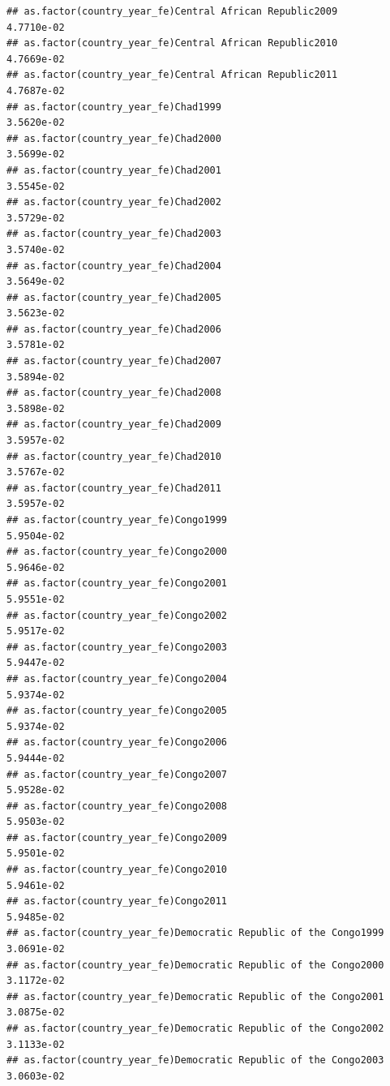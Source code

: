 \documentclass[
  a4paper,
]{article}
\begin{document}
\begin{verbatim}
## as.factor(country_year_fe)Central African Republic2009          4.7710e-02
## as.factor(country_year_fe)Central African Republic2010          4.7669e-02
## as.factor(country_year_fe)Central African Republic2011          4.7687e-02
## as.factor(country_year_fe)Chad1999                              3.5620e-02
## as.factor(country_year_fe)Chad2000                              3.5699e-02
## as.factor(country_year_fe)Chad2001                              3.5545e-02
## as.factor(country_year_fe)Chad2002                              3.5729e-02
## as.factor(country_year_fe)Chad2003                              3.5740e-02
## as.factor(country_year_fe)Chad2004                              3.5649e-02
## as.factor(country_year_fe)Chad2005                              3.5623e-02
## as.factor(country_year_fe)Chad2006                              3.5781e-02
## as.factor(country_year_fe)Chad2007                              3.5894e-02
## as.factor(country_year_fe)Chad2008                              3.5898e-02
## as.factor(country_year_fe)Chad2009                              3.5957e-02
## as.factor(country_year_fe)Chad2010                              3.5767e-02
## as.factor(country_year_fe)Chad2011                              3.5957e-02
## as.factor(country_year_fe)Congo1999                             5.9504e-02
## as.factor(country_year_fe)Congo2000                             5.9646e-02
## as.factor(country_year_fe)Congo2001                             5.9551e-02
## as.factor(country_year_fe)Congo2002                             5.9517e-02
## as.factor(country_year_fe)Congo2003                             5.9447e-02
## as.factor(country_year_fe)Congo2004                             5.9374e-02
## as.factor(country_year_fe)Congo2005                             5.9374e-02
## as.factor(country_year_fe)Congo2006                             5.9444e-02
## as.factor(country_year_fe)Congo2007                             5.9528e-02
## as.factor(country_year_fe)Congo2008                             5.9503e-02
## as.factor(country_year_fe)Congo2009                             5.9501e-02
## as.factor(country_year_fe)Congo2010                             5.9461e-02
## as.factor(country_year_fe)Congo2011                             5.9485e-02
## as.factor(country_year_fe)Democratic Republic of the Congo1999  3.0691e-02
## as.factor(country_year_fe)Democratic Republic of the Congo2000  3.1172e-02
## as.factor(country_year_fe)Democratic Republic of the Congo2001  3.0875e-02
## as.factor(country_year_fe)Democratic Republic of the Congo2002  3.1133e-02
## as.factor(country_year_fe)Democratic Republic of the Congo2003  3.0603e-02

\end{verbatim}
\end{document}
